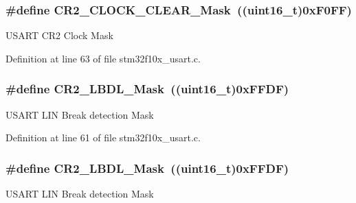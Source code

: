 \subsubsection[{\texorpdfstring{C\+R2\+\_\+\+C\+L\+O\+C\+K\+\_\+\+C\+L\+E\+A\+R\+\_\+\+Mask}{CR2_CLOCK_CLEAR_Mask}}]{\setlength{\rightskip}{0pt plus 5cm}\#define C\+R2\+\_\+\+C\+L\+O\+C\+K\+\_\+\+C\+L\+E\+A\+R\+\_\+\+Mask~(({\bf uint16\+\_\+t})0x\+F0\+F\+F)}\hypertarget{group___u_s_a_r_t___private___defines_ga846e1873279b2b0798cc34d76bd80592}{}\label{group___u_s_a_r_t___private___defines_ga846e1873279b2b0798cc34d76bd80592}
U\+S\+A\+RT C\+R2 Clock Mask 

Definition at line 63 of file stm32f10x\+\_\+usart.\+c.

\subsubsection[{\texorpdfstring{C\+R2\+\_\+\+L\+B\+D\+L\+\_\+\+Mask}{CR2_LBDL_Mask}}]{\setlength{\rightskip}{0pt plus 5cm}\#define C\+R2\+\_\+\+L\+B\+D\+L\+\_\+\+Mask~(({\bf uint16\+\_\+t})0x\+F\+F\+D\+F)}\hypertarget{group___u_s_a_r_t___private___defines_ga9b365a89de44809a52895090e9050646}{}\label{group___u_s_a_r_t___private___defines_ga9b365a89de44809a52895090e9050646}
U\+S\+A\+RT L\+IN Break detection Mask 

Definition at line 61 of file stm32f10x\+\_\+usart.\+c.

\subsubsection[{\texorpdfstring{C\+R2\+\_\+\+L\+B\+D\+L\+\_\+\+Mask}{CR2_LBDL_Mask}}]{\setlength{\rightskip}{0pt plus 5cm}\#define C\+R2\+\_\+\+L\+B\+D\+L\+\_\+\+Mask~(({\bf uint16\+\_\+t})0x\+F\+F\+D\+F)}\hypertarget{group___u_s_a_r_t___private___defines_ga9b365a89de44809a52895090e9050646}{}\label{group___u_s_a_r_t___private___defines_ga9b365a89de44809a52895090e9050646}
U\+S\+A\+RT L\+IN Break detection Mask 

